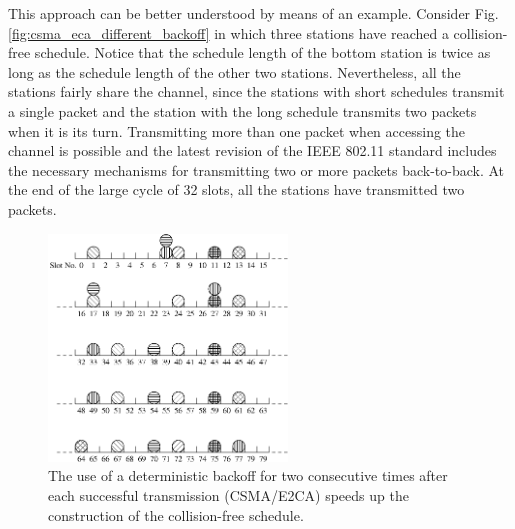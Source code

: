 \documentclass[journal]{IEEEtran}
\begin{document}
This approach can be better understood by means of an example.
Consider Fig. \ref{fig:csma_eca_different_backoff} in which three stations have reached a collision-free schedule.
Notice that the schedule length of the bottom station is twice as long as the schedule length of the other two stations.
Nevertheless, all the stations fairly share the channel, since the stations with short schedules transmit a single packet and the station with the long schedule transmits two packets when it is its turn.
Transmitting more than one packet when accessing the channel is possible and the latest revision of the IEEE 802.11 standard includes the necessary mechanisms for transmitting two or more packets back-to-back.
At the end of the large cycle of 32 slots, all the stations have transmitted two packets.


\begin{figure}[!t]
\centering
\includegraphics[width=2.5in]{figures/csma_e2ca}
\caption{The use of a deterministic backoff for two consecutive times after each successful transmission (CSMA/E2CA) speeds up the construction of the collision-free schedule.}
\label{fig:csma_e2ca}
\end{figure}
\end{document}
